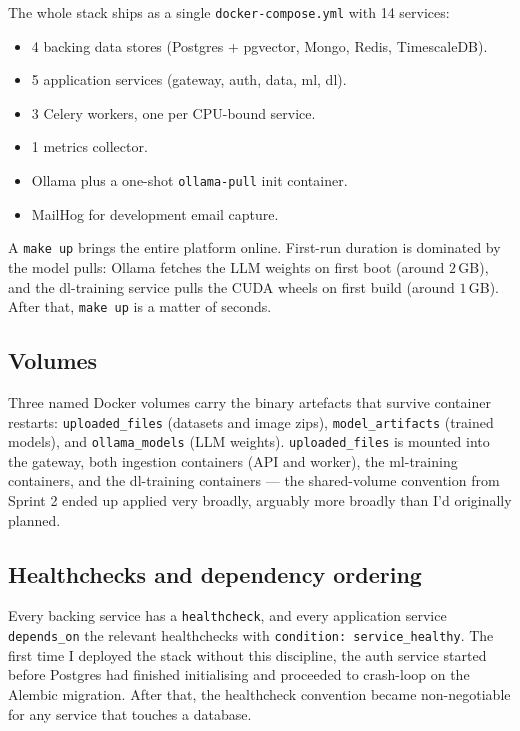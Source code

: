 \documentclass[12pt, a4paper]{report}
\begin{document}
The whole stack ships as a single \texttt{docker-compose.yml} with 14
services:

\begin{itemize}
    \item 4 backing data stores (Postgres + pgvector, Mongo, Redis,
        TimescaleDB).
    \item 5 application services (gateway, auth, data, ml, dl).
    \item 3 Celery workers, one per CPU-bound service.
    \item 1 metrics collector.
    \item Ollama plus a one-shot \texttt{ollama-pull} init container.
    \item MailHog for development email capture.
\end{itemize}

A \texttt{make up} brings the entire platform online. First-run
duration is dominated by the model pulls: Ollama fetches the LLM
weights on first boot (around $2$\,GB), and the dl-training service
pulls the CUDA wheels on first build (around $1$\,GB). After that,
\texttt{make up} is a matter of seconds.

\subsection{Volumes}

Three named Docker volumes carry the binary artefacts that survive
container restarts: \texttt{uploaded\_files} (datasets and image
zips), \texttt{model\_artifacts} (trained models), and
\texttt{ollama\_models} (LLM weights). \texttt{uploaded\_files} is
mounted into the gateway, both ingestion containers (API and worker),
the ml-training containers, and the dl-training containers --- the
shared-volume convention from Sprint 2 ended up applied very broadly,
arguably more broadly than I'd originally planned.

\subsection{Healthchecks and dependency ordering}

Every backing service has a \texttt{healthcheck}, and every
application service \texttt{depends\_on} the relevant healthchecks
with \texttt{condition: service\_healthy}. The first time I deployed
the stack without this discipline, the auth service started before
Postgres had finished initialising and proceeded to crash-loop on the
Alembic migration. After that, the healthcheck convention became
non-negotiable for any service that touches a database.
\end{document}
